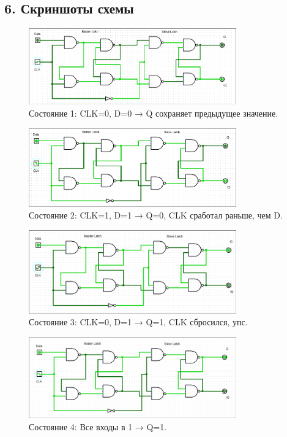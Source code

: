 \documentclass[a4paper,12pt]{article}
\begin{document}
\subsection*{6. Скриншоты схемы}

\begin{figure}[h!]
    \centering
    \includegraphics[width=0.8\textwidth]{pictures/dff_0.png}
    \caption{Состояние 1: CLK=0, D=0 → Q сохраняет предыдущее значение.}
\end{figure}

\begin{figure}[h!]
    \centering
    \includegraphics[width=0.8\textwidth]{pictures/dff_1.png}
    \caption{Состояние 2: CLK=1, D=1 → Q=0, CLK сработал раньше, чем D.}
\end{figure}

\begin{figure}[h!]
    \centering
    \includegraphics[width=0.8\textwidth]{pictures/dff_2.png}
    \caption{Состояние 3: CLK=0, D=1 → Q=1, CLK сбросился, упс.}
\end{figure}

\begin{figure}[h!]
    \centering
    \includegraphics[width=0.8\textwidth]{pictures/dff_3.png}
    \caption{Состояние 4: Все входы в 1 → Q=1.}
\end{figure}
\end{document}
